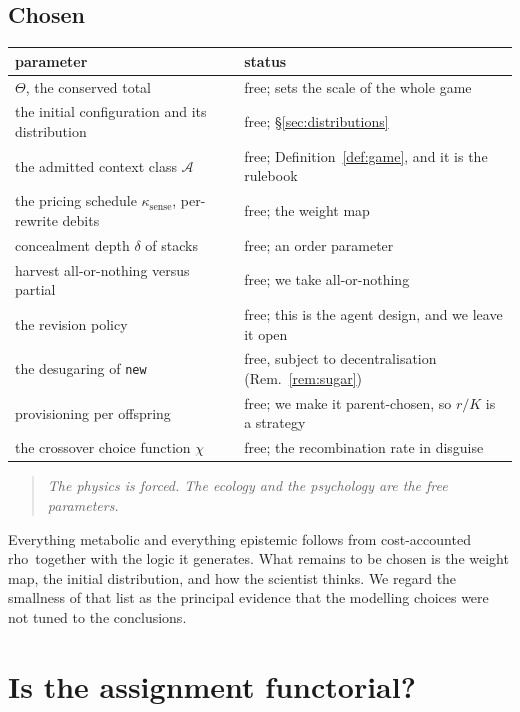 \documentclass[11pt]{article}
\theoremstyle{plain}
\theoremstyle{definition}
\newcommand{\rhoc}{\textsf{rho}}
\begin{document}
\subsection{Chosen}

\begin{table}[h]
\centering
\begin{tabular}{@{}p{}p{}@{}}
\toprule
\textbf{parameter} & \textbf{status} \\
\midrule
$\Theta$, the conserved total & free; sets the scale of the whole game \\
the initial configuration and its distribution & free; \S\ref{sec:distributions} \\
the admitted context class $\mathcal{A}$ & free; Definition~\ref{def:game}, and it is the rulebook \\
the pricing schedule $\kappa_{\mathrm{sense}}$, per-rewrite debits & free; the weight map \\
concealment depth $\delta$ of stacks & free; an order parameter \\
harvest all-or-nothing versus partial & free; we take all-or-nothing \\
the revision policy & free; this is the agent design, and we leave it open \\
the desugaring of \texttt{new} & free, subject to decentralisation
(Rem.~\ref{rem:sugar}) \\
provisioning per offspring & free; we make it parent-chosen, so $r/K$ is a strategy \\
the crossover choice function $\chi$ & free; the recombination rate in disguise \\
\bottomrule
\end{tabular}
\end{table}

\begin{quote}
\itshape The physics is forced. The ecology and the psychology are the free parameters.
\end{quote}

Everything metabolic and everything epistemic follows from cost-accounted \rhoc\ together with the
logic it generates. What remains to be chosen is the weight map, the initial distribution, and how the
scientist thinks. We regard the smallness of that list as the principal evidence that the modelling
choices were not tuned to the conclusions.

\section{Is the assignment functorial?}
\label{sec:functor}
\end{document}
